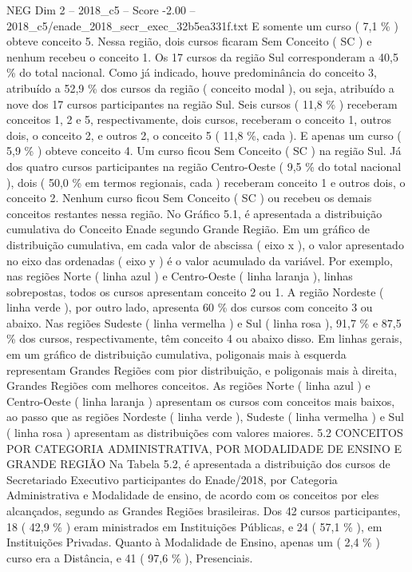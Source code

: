 \begin{textsample}{NEG Dim 2 – 2018\_c5 – Score -2.00 – 2018\_c5/enade\_2018\_secr\_exec\_32b5ea331f.txt}
E somente um curso ( 7,1 \% ) obteve conceito 5.
Nessa região, dois cursos ficaram Sem Conceito ( SC ) e nenhum recebeu o conceito 1.
Os 17 cursos da região Sul corresponderam a 40,5 \% do total nacional.
Como já indicado, houve predominância do conceito 3, atribuído a 52,9 \% dos cursos da região ( conceito modal ), ou seja, atribuído a nove dos 17 cursos participantes na região Sul.
Seis cursos ( 11,8 \% ) receberam conceitos 1, 2 e 5, respectivamente, dois cursos, receberam o conceito 1, outros dois, o conceito 2, e outros 2, o conceito 5 ( 11,8 \%, cada ).
E apenas um curso ( 5,9 \% ) obteve conceito 4.
Um curso ficou Sem Conceito ( SC ) na região Sul.
Já dos quatro cursos participantes na região Centro-Oeste ( 9,5 \% do total nacional ), dois ( 50,0 \% em termos regionais, cada ) receberam conceito 1 e outros dois, o conceito 2.
Nenhum curso ficou Sem Conceito ( SC ) ou recebeu os demais conceitos restantes nessa região.
No Gráfico 5.1, é apresentada a distribuição cumulativa do Conceito Enade segundo Grande Região.
Em um gráfico de distribuição cumulativa, em cada valor de abscissa ( eixo x ), o valor apresentado no eixo das ordenadas ( eixo y ) é o valor acumulado da variável.
Por exemplo, nas regiões Norte ( linha azul ) e Centro-Oeste ( linha laranja ), linhas sobrepostas, todos os cursos apresentam conceito 2 ou 1.
A região Nordeste ( linha verde ), por outro lado, apresenta 60 \% dos cursos com conceito 3 ou abaixo.
Nas regiões Sudeste ( linha vermelha ) e Sul ( linha rosa ), 91,7 \% e 87,5 \% dos cursos, respectivamente, têm conceito 4 ou abaixo disso.
Em linhas gerais, em um gráfico de distribuição cumulativa, poligonais mais à esquerda representam Grandes Regiões com pior distribuição, e poligonais mais à direita, Grandes Regiões com melhores conceitos.
As regiões Norte ( linha azul ) e Centro-Oeste ( linha laranja ) apresentam os cursos com conceitos mais baixos, ao passo que as regiões Nordeste ( linha verde ), Sudeste ( linha vermelha ) e Sul ( linha rosa ) apresentam as distribuições com valores maiores. 5.2 CONCEITOS POR CATEGORIA ADMINISTRATIVA, POR MODALIDADE DE ENSINO E GRANDE REGIÃO Na Tabela 5.2, é apresentada a distribuição dos cursos de Secretariado Executivo participantes do Enade/2018, por Categoria Administrativa e Modalidade de ensino, de acordo com os conceitos por eles alcançados, segundo as Grandes Regiões brasileiras.
Dos 42 cursos participantes, 18 ( 42,9 \% ) eram ministrados em Instituições Públicas, e 24 ( 57,1 \% ), em Instituições Privadas.
Quanto à Modalidade de Ensino, apenas um ( 2,4 \% ) curso era a Distância, e 41 ( 97,6 \% ), Presenciais.

\end{textsample}
